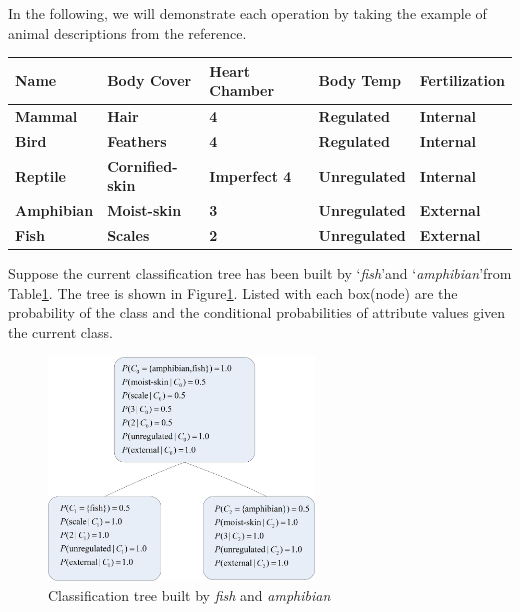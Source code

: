 In the following, we will demonstrate each operation by taking the example of animal descriptions from the reference\cite{fisher1987knowledge}. 
\begin{table}[!ht]
{
\centering
\begin{tabular}{l l l l l}\hline
\textbf{Name} & \textbf{Body Cover} & \textbf{Heart Chamber} & \textbf{Body Temp} & \textbf{Fertilization}\\\hline
\textbf{Mammal} & \textbf{Hair} & \textbf{4} & \textbf{Regulated} & \textbf{Internal}\\
\textbf{Bird} & \textbf{Feathers} & \textbf{4} & \textbf{Regulated} & \textbf{Internal}\\
\textbf{Reptile} & \textbf{Cornified-skin} & \textbf{Imperfect 4} & \textbf{Unregulated} & \textbf{Internal}\\
\textbf{Amphibian} & \textbf{Moist-skin} & \textbf{3} & \textbf{Unregulated} & \textbf{External}\\
\textbf{Fish} & \textbf{Scales} & \textbf{2} & \textbf{Unregulated} & \textbf{External}\\
\hline
\end{tabular}
\label{tab:animal}}
\end{table}

Suppose the current classification tree has been built by \lq{\emph{fish}}\rq and  \lq{\emph{amphibian}}\rq from Table\ref{tab:animal}. The tree is shown in Figure\ref{Fig:animaltree}. Listed with each box(node) are the probability of the class and the conditional probabilities of attribute values given the current class.
\begin{figure}[!ht]
    \centering
    \includegraphics[width=200pt]{../images/animaltree.jpg}
    \caption{Classification tree built by \emph{fish} and \emph{amphibian}}
    \label{Fig:animaltree}
\end{figure}

